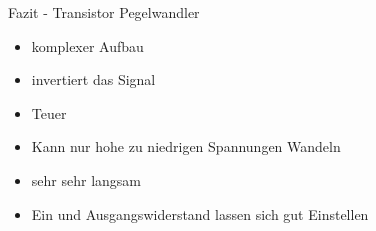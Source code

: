 
\begin{frame}[c]{Fazit - Transistor Pegelwandler}

  \begin{itemize}
    \item komplexer Aufbau
    \item invertiert das Signal
    \item Teuer
    \item Kann nur hohe zu niedrigen Spannungen Wandeln
    \item sehr sehr langsam
    \item Ein und Ausgangswiderstand lassen sich gut Einstellen
  \end{itemize}
\end{frame}

